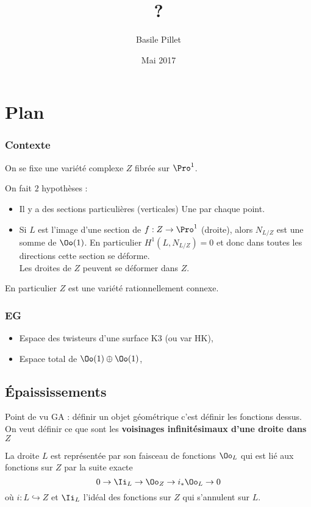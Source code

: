 \documentclass[12pt,makeidx]{amsart}
\author{Basile Pillet}
\date{Mai 2017}
\title{?}
\begin{document}
\maketitle
\tableofcontents


\section{Plan}
\label{sec:orgheadline14}

\subsubsection{Contexte}
\label{sec:orgheadline1}
On se fixe une variété complexe \(Z\) fibrée sur \(\Pro^1\).

On fait \(2\) hypothèses :
\begin{itemize}
\item Il y a des sections particulières (verticales)
Une par chaque point.
\item Si \(L\) est l'image d'une section de \(f : Z \to \Pro^1\) (droite), alors 
\(N_{L/Z}\) est une somme de \(\Oo(1)\).
En particulier \(H^1(L,N_{L/Z}) = 0\) et donc dans toutes les directions cette section se déforme.\\
Les droites de \(Z\) peuvent se déformer dans \(Z\).
\end{itemize}

En particulier \(Z\) est une variété rationnellement connexe.

\subsubsection{EG}
\label{sec:orgheadline2}
\begin{itemize}
\item Espace des twisteurs d'une surface K3 (ou var HK),
\item Espace total de \(\Oo(1) \oplus \Oo(1)\),
\end{itemize}


\subsection{Épaississements}
\label{sec:orgheadline4}
Point de vu GA : définir un objet géométrique c'est définir les fonctions dessus. On veut définir ce que sont les \textbf{voisinages infinitésimaux d'une droite dans \(Z\)}

La droite \(L\) est représentée par son faisceau de fonctions \(\Oo_L\) qui est lié aux fonctions sur \(Z\) par la suite exacte
\[
0 \to \Ii_L \to \Oo_Z \to i_* \Oo_L \to 0
\]
où \(i : L \hookrightarrow Z\) et \(\Ii_L\) l'idéal des fonctions sur \(Z\) qui s'annulent sur \(L\).
\end{document}
